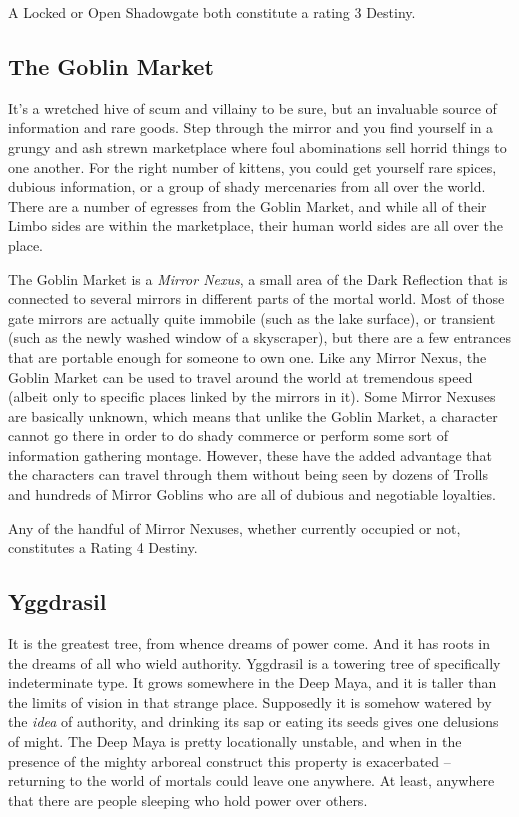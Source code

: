 A Locked or Open Shadowgate both constitute a rating 3 Destiny.

\subsection{The Goblin Market}
\hspace{\parindent} It's a wretched hive of scum and villainy to be sure, but an invaluable source of information and rare goods. Step through the mirror and you find yourself in a grungy and ash strewn marketplace where foul abominations sell horrid things to one another. For the right number of kittens, you could get yourself rare spices, dubious information, or a group of shady mercenaries from all over the world. There are a number of egresses from the Goblin Market, and while all of their Limbo sides are within the marketplace, their human world sides are all over the place.

The Goblin Market is a \textit{Mirror Nexus}, a small area of the Dark Reflection that is connected to several mirrors in different parts of the mortal world. Most of those gate mirrors are actually quite immobile (such as the lake surface), or transient (such as the newly washed window of a skyscraper), but there are a few entrances that are portable enough for someone to own one. Like any Mirror Nexus, the Goblin Market can be used to travel around the world at tremendous speed (albeit only to specific places linked by the mirrors in it). Some Mirror Nexuses are basically unknown, which means that unlike the Goblin Market, a character cannot go there in order to do shady commerce or perform some sort of information gathering montage. However, these have the added advantage that the characters can travel through them without being seen by dozens of Trolls and hundreds of Mirror Goblins who are all of dubious and negotiable loyalties.

Any of the handful of Mirror Nexuses, whether currently occupied or not, constitutes a Rating 4 Destiny.

\subsection{Yggdrasil}
\hspace{\parindent} It is the greatest tree, from whence dreams of power come. And it has roots in the dreams of all who wield authority. Yggdrasil is a towering tree of specifically indeterminate type. It grows somewhere in the Deep Maya, and it is taller than the limits of vision in that strange place. Supposedly it is somehow watered by the \textit{idea} of authority, and drinking its sap or eating its seeds gives one delusions of might. The Deep Maya is pretty locationally unstable, and when in the presence of the mighty arboreal construct this property is exacerbated -- returning to the world of mortals could leave one anywhere. At least, anywhere that there are people sleeping who hold power over others.

